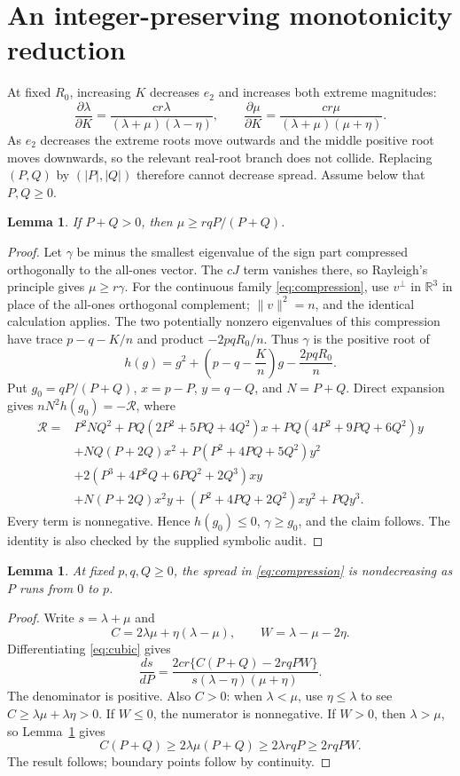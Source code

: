 \documentclass[11pt]{article}
\newtheorem{lemma}[theorem]{Lemma}
\newcommand{\R}{\mathbb R}
\begin{document}
\section{An integer-preserving monotonicity reduction}
At fixed $R_0$, increasing $K$ decreases $e_2$ and increases both extreme
magnitudes:
\[
 \frac{\partial\lambda}{\partial K}
  =\frac{cr\lambda}{(\lambda+\mu)(\lambda-\eta)},\qquad
 \frac{\partial\mu}{\partial K}
  =\frac{cr\mu}{(\lambda+\mu)(\mu+\eta)}.
\]
As $e_2$ decreases the extreme roots move outwards and the middle positive
root moves downwards, so the relevant real-root branch does not collide.
Replacing $(P,Q)$ by $(|P|,|Q|)$ therefore cannot decrease spread. Assume below
that $P,Q\ge0$.

\begin{lemma}\label{lem:negative}
If $P+Q>0$, then $\mu\ge rqP/(P+Q)$.
\end{lemma}
\begin{proof}
Let $\gamma$ be minus the smallest eigenvalue of the sign part compressed
orthogonally to the all-ones vector. The $cJ$ term vanishes there, so
Rayleigh's principle gives $\mu\ge r\gamma$. For the continuous family
\eqref{eq:compression}, use $v^\perp$ in $\R^3$ in place of the all-ones
orthogonal complement; $\|v\|^2=n$, and the identical calculation applies.
The two potentially nonzero eigenvalues of this compression have trace
$p-q-K/n$ and product $-2pqR_0/n$. Thus $\gamma$ is the positive root of
\[
 h(g)=g^2+\left(p-q-\frac Kn\right)g-\frac{2pqR_0}{n}.
\]
Put $g_0=qP/(P+Q)$, $x=p-P$, $y=q-Q$, and $N=P+Q$. Direct expansion gives
$nN^2h(g_0)=-\mathcal R$, where
\begin{align*}
\mathcal R={}&P^2NQ^2
 +PQ(2P^2+5PQ+4Q^2)x
 +PQ(4P^2+9PQ+6Q^2)y\\
&+NQ(P+2Q)x^2+P(P^2+4PQ+5Q^2)y^2\\
&+2(P^3+4P^2Q+6PQ^2+2Q^3)xy\\
&+N(P+2Q)x^2y+(P^2+4PQ+2Q^2)xy^2+PQy^3.
\end{align*}
Every term is nonnegative. Hence $h(g_0)\le0$, $\gamma\ge g_0$, and the claim
follows. The identity is also checked by the supplied symbolic audit.
\end{proof}

\begin{lemma}\label{lem:monotone}
At fixed $p,q,Q\ge0$, the spread in \eqref{eq:compression} is nondecreasing
as $P$ runs from $0$ to $p$.
\end{lemma}
\begin{proof}
Write $s=\lambda+\mu$ and
\[
 C=2\lambda\mu+\eta(\lambda-\mu),\qquad W=\lambda-\mu-2\eta.
\]
Differentiating \eqref{eq:cubic} gives
\begin{equation}\label{eq:derivative}
 \frac{ds}{dP}=\frac{2cr\{C(P+Q)-2rqPW\}}
 {s(\lambda-\eta)(\mu+\eta)}.
\end{equation}
The denominator is positive. Also $C>0$: when $\lambda<\mu$, use
$\eta\le\lambda$ to see $C\ge\lambda\mu+\lambda\eta>0$.
If $W\le0$, the numerator is nonnegative. If $W>0$, then $\lambda>\mu$,
so Lemma~\ref{lem:negative} gives
\[
 C(P+Q)\ge2\lambda\mu(P+Q)\ge2\lambda rqP\ge2rqPW.
\]
The result follows; boundary points follow by continuity.
\end{proof}
\end{document}
